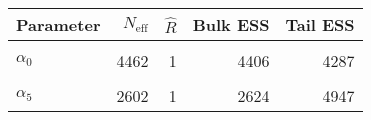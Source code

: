 \begin{table}[!h]
\centering
\begin{tabular}{>{\raggedright\arraybackslash}p{2cm}rrrr}
\toprule
Parameter & $N_{\text{eff}}$ & $\widehat{R}$ & Bulk ESS & Tail ESS\\
\midrule
\cellcolor{gray!6}{$\rho$} & \cellcolor{gray!6}{42971} & \cellcolor{gray!6}{1} & \cellcolor{gray!6}{43021} & \cellcolor{gray!6}{44268}\\
$\alpha_{0}$ & 4462 & 1 & 4406 & 4287\\
\cellcolor{gray!6}{$\alpha_{2}$} & \cellcolor{gray!6}{4164} & \cellcolor{gray!6}{1} & \cellcolor{gray!6}{4198} & \cellcolor{gray!6}{4275}\\
$\alpha_{5}$ & 2602 & 1 & 2624 & 4947\\
\bottomrule
\end{tabular}
\end{table}